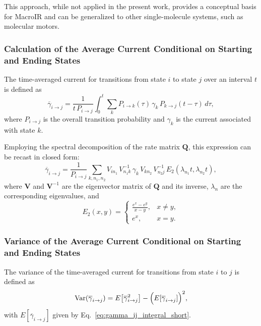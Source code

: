 \documentclass[pdflatex,sn-nature]{sn-jnl}%
\begin{document}
This approach, while not applied in the present work, provides a conceptual basis for MacroIR and can be generalized to other single-molecule systems, such as molecular motors.


\subsubsection{Calculation of the Average Current Conditional on Starting and Ending States}

The time-averaged current for transitions from state \(i\) to state \(j\) over an interval \(t\) is defined as
\begin{equation}
	\overline{\gamma}_{i \rightarrow j} = \frac{1}{t\,P_{i\rightarrow j}} \int_0^t \sum_k P_{i\rightarrow k}(\tau)\,\gamma_k\,P_{k\rightarrow j}(t-\tau)\,d\tau,
	\label{eq:gamma_ij_integral_short}
\end{equation}
where \(P_{i\rightarrow j}\) is the overall transition probability and \(\gamma_k\) is the current associated with state \(k\).

Employing the spectral decomposition of the rate matrix \(\mathbf{Q}\), this expression can be recast in closed form:
\begin{equation}
	\overline{\gamma}_{i \rightarrow j} = \frac{1}{P_{i\rightarrow j}} \sum_{k, n_1, n_2} V_{i n_1}\,V^{-1}_{n_1 k}\,\gamma_k\,V_{k n_2}\,V^{-1}_{n_2 j}\,E_2(\lambda_{n_1}t,\lambda_{n_2}t),
	\label{eq:gamma_ij_formula_short}
\end{equation}
where \(\mathbf{V}\) and \(\mathbf{V}^{-1}\) are the eigenvector matrix of \(\mathbf{Q}\) and its inverse, \(\lambda_{n}\) are the corresponding eigenvalues, and
\begin{equation}
	E_2(x,y)=
	\begin{cases}
		\frac{e^x-e^y}{x-y}, & x\neq y, \\
		e^x, & x=y.
	\end{cases}
	\label{eq:E2_short}
\end{equation}


\subsubsection{Variance of the Average Current Conditional on Starting and Ending States}

The variance of the time-averaged current for transitions from state \(i\) to \(j\) is defined as
\begin{equation}
\mathrm{Var}(\overline{\gamma}_{i\rightarrow j}) = E\bigl[\overline{\gamma}_{i\rightarrow j}^2\bigr] - \Bigl(E[\overline{\gamma}_{i\rightarrow j}]\Bigr)^2,
\label{eq:variance_gamma_short}
	\end{equation}
	with \(E[\overline{\gamma}_{i\rightarrow j}]\) given by Eq.~\ref{eq:gamma_ij_integral_short}.
\end{document}
